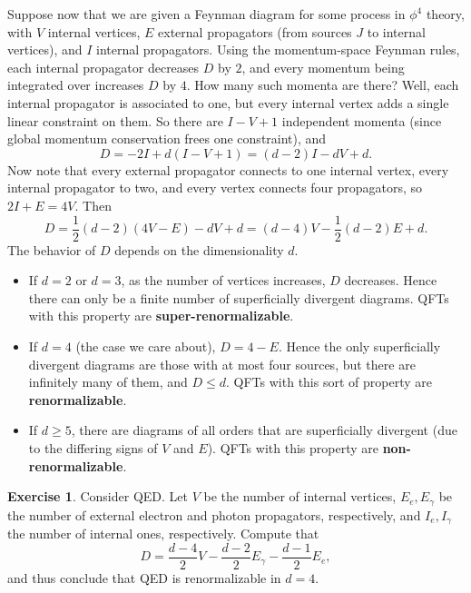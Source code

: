 \documentclass{report}
\theoremstyle{plain}
\theoremstyle{definition}
\newtheorem{exercise}{Exercise}[section]
\theoremstyle{remark}
\begin{document}
Suppose now that we are given a Feynman diagram for some process in
$\phi^4$ theory, with $V$ internal vertices, $E$ external propagators
(from sources $J$ to internal vertices), and $I$ internal propagators.
Using the momentum-space Feynman rules, each internal propagator
decreases $D$ by $2$, and every momentum being integrated over
increases $D$ by $4$. How many such momenta are there? Well, each
internal propagator is associated to one, but every internal vertex
adds a single linear constraint on them. So there are $I - V + 1$
independent momenta (since global momentum conservation frees one
constraint), and
$$ D = -2I + d(I - V + 1) = (d - 2)I - dV + d. $$
Now note that every external propagator connects to one internal
vertex, every internal propagator to two, and every vertex connects
four propagators, so $2I + E = 4V$. Then
$$ D = \frac{1}{2}(d - 2)(4V - E) - dV + d = (d - 4)V - \frac{1}{2}(d - 2)E + d. $$
The behavior of $D$ depends on the dimensionality $d$.
\begin{itemize}
\item If $d = 2$ or $d = 3$, as the number of vertices increases, $D$
  decreases. Hence there can only be a finite number of superficially
  divergent diagrams. QFTs with this property are {\bf
    super-renormalizable}.
\item If $d = 4$ (the case we care about), $D = 4 - E$. Hence the only
  superficially divergent diagrams are those with at most four
  sources, but there are infinitely many of them, and $D \le d$. QFTs
  with this sort of property are {\bf renormalizable}.
\item If $d \ge 5$, there are diagrams of all orders that are
  superficially divergent (due to the differing signs of $V$ and $E$).
  QFTs with this property are {\bf non-renormalizable}.
\end{itemize}

\begin{exercise}
  Consider QED. Let $V$ be the number of internal vertices,
  $E_e, E_\gamma$ be the number of external electron and photon
  propagators, respectively, and $I_e, I_\gamma$ the number of
  internal ones, respectively. Compute that
  $$ D = \frac{d-4}{2}V - \frac{d-2}{2}E_\gamma - \frac{d-1}{2} E_e, $$
  and thus conclude that QED is renormalizable in $d = 4$.
\end{exercise}
\end{document}
